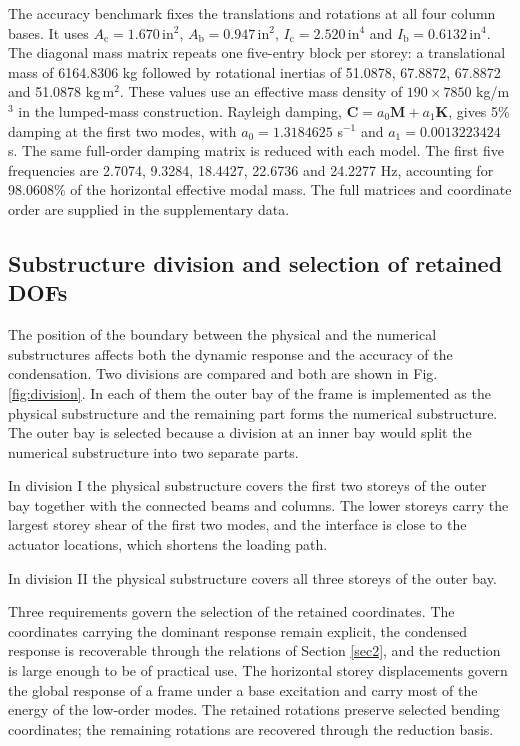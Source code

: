 \documentclass[a4paper,fleqn,review,12pt]{cas-sc}
\numberwithin{equation}{section}
\newcommand{\rev}[1]{{\color{red}#1}}
\begin{document}
\rev{The accuracy benchmark fixes the translations and rotations at all four column bases. It uses \(A_{\mathrm c}=1.670\,\mathrm{in}^{2}\), \(A_{\mathrm b}=0.947\,\mathrm{in}^{2}\), \(I_{\mathrm c}=2.520\,\mathrm{in}^{4}\) and \(I_{\mathrm b}=0.6132\,\mathrm{in}^{4}\). The diagonal mass matrix repeats one five-entry block per storey: a translational mass of 6164.8306 kg followed by rotational inertias of 51.0878, 67.8872, 67.8872 and 51.0878 kg\,m\(^{2}\). These values use an effective mass density of \(190\times7850\) kg/m\(^{3}\) in the lumped-mass construction. Rayleigh damping, \(\mathbf C=a_0\mathbf M+a_1\mathbf K\), gives 5\% damping at the first two modes, with \(a_0=1.3184625\) s\(^{-1}\) and \(a_1=0.0013223424\) s. The same full-order damping matrix is reduced with each model. The first five frequencies are 2.7074, 9.3284, 18.4427, 22.6736 and 24.2277 Hz, accounting for 98.0608\% of the horizontal effective modal mass. The full matrices and coordinate order are supplied in the supplementary data.}

\subsection{Substructure division and selection of retained DOFs}
\label{sec:division}

The position of the boundary between the physical and the numerical substructures affects both the dynamic response and the accuracy of the condensation. Two divisions are compared and both are shown in Fig. \ref{fig:division}. In each of them the outer bay of the frame is implemented as the physical substructure and the remaining part forms the numerical substructure. The outer bay is selected because a division at an inner bay would split the numerical substructure into two separate parts.

In division I the physical substructure covers the first two storeys of the outer bay together with the connected beams and columns. The lower storeys carry the largest storey shear of the first two modes, and the interface is close to the actuator locations, which shortens the loading path. 

In division II the physical substructure covers all three storeys of the outer bay. 

Three requirements govern the selection of the retained coordinates. The coordinates carrying the dominant response remain explicit, the condensed response is recoverable through the relations of Section \ref{sec2}, and the reduction is large enough to be of practical use. The horizontal storey displacements govern the global response of a frame under a base excitation and carry most of the energy of the low-order modes. \rev{The retained rotations preserve selected bending coordinates; the remaining rotations are recovered through the reduction basis.}
\end{document}
